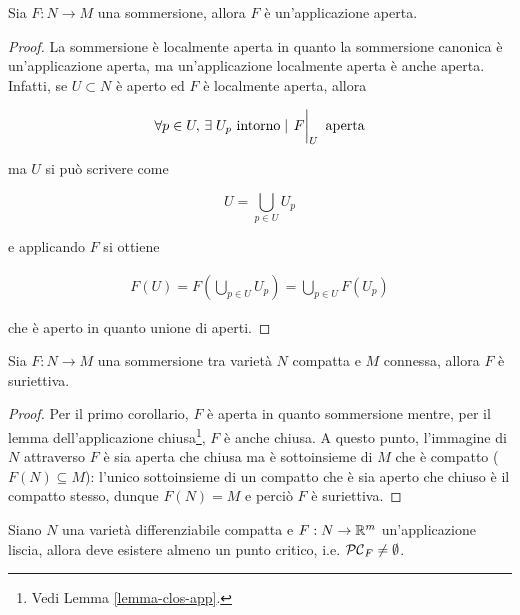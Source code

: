 \begin{corollary}\label{th-somm-loc-cor}
	Sia $ F : N \to M $ una sommersione, allora $ F $ è un'applicazione aperta.
\end{corollary}

\begin{proof}
	La sommersione è localmente aperta in quanto la sommersione canonica è un'applicazione aperta, ma un'applicazione localmente aperta è anche aperta. Infatti, se $ U \subset N $ è aperto ed $ F $ è localmente aperta, allora
	
	\begin{equation}
		\forall p \in U, \, \E U_{p} \text{ intorno} \mid \eval{F}_{U} \text{ aperta}
	\end{equation}

	ma $ U $ si può scrivere come
	
	\begin{equation}
		U = \bigcup_{p \in U} U_{p}
	\end{equation}

	e applicando $ F $ si ottiene
	
	\begin{align}
		F(U) = F \left( \bigcup_{p \in U} U_{p} \right) %
		= \bigcup_{p \in U} F(U_{p})
	\end{align}

	che è aperto in quanto unione di aperti.
\end{proof}

\begin{corollary}
	Sia $ F : N \to M $ una sommersione tra varietà $ N $ compatta e $ M $ connessa, allora $ F $ è suriettiva.
\end{corollary}

\begin{proof}
	Per il primo corollario, $ F $ è aperta in quanto sommersione mentre, per il lemma dell'applicazione chiusa\footnote{%
		Vedi Lemma \ref{lemma-clos-app}.%
	}, $ F $ è anche chiusa. A questo punto, l'immagine di $ N $ attraverso $ F $ è sia aperta che chiusa ma è sottoinsieme di $ M $ che è compatto ($ F(N) \subseteq M $): l'unico sottoinsieme di un compatto che è sia aperto che chiuso è il compatto stesso, dunque $ F(N) = M $ e perciò $ F $ è suriettiva.
\end{proof}

\begin{corollary}
	Siano $ N $ una varietà differenziabile compatta e $ F : N \to \mathbb{R}^{m} $ un'applicazione liscia, allora deve esistere almeno un punto critico, i.e. $ \mathcal{PC}_{F} \neq \emptyset $.
\end{corollary}

